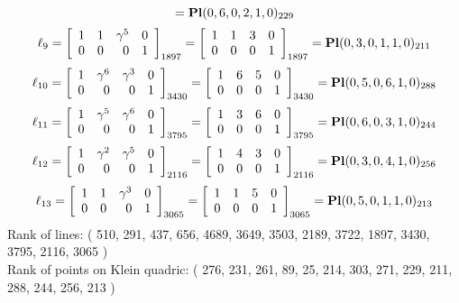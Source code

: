 \documentclass{article}
\begin{document}
{$$={\rm\bf Pl}(0,6,0,2,1,0 )_{229}$$
$$
\ell_{9} = 
\left[
\begin{array}{*{4}{r}}
1 & 1 & \gamma^{5} & 0\\
0 & 0 & 0 & 1\\
\end{array}
\right]
_{1897}
=
\left[
\begin{array}{*{4}c}
1  & 1  & 3  & 0\\
0  & 0  & 0  & 1\\
\end{array}
\right]_{1897}
={\rm\bf Pl}(0,3,0,1,1,0 )_{211}$$
$$
\ell_{10} = 
\left[
\begin{array}{*{4}{r}}
1 & \gamma^{6} & \gamma^{3} & 0\\
0 & 0 & 0 & 1\\
\end{array}
\right]
_{3430}
=
\left[
\begin{array}{*{4}c}
1  & 6  & 5  & 0\\
0  & 0  & 0  & 1\\
\end{array}
\right]_{3430}
={\rm\bf Pl}(0,5,0,6,1,0 )_{288}$$
$$
\ell_{11} = 
\left[
\begin{array}{*{4}{r}}
1 & \gamma^{5} & \gamma^{6} & 0\\
0 & 0 & 0 & 1\\
\end{array}
\right]
_{3795}
=
\left[
\begin{array}{*{4}c}
1  & 3  & 6  & 0\\
0  & 0  & 0  & 1\\
\end{array}
\right]_{3795}
={\rm\bf Pl}(0,6,0,3,1,0 )_{244}$$
$$
\ell_{12} = 
\left[
\begin{array}{*{4}{r}}
1 & \gamma^{2} & \gamma^{5} & 0\\
0 & 0 & 0 & 1\\
\end{array}
\right]
_{2116}
=
\left[
\begin{array}{*{4}c}
1  & 4  & 3  & 0\\
0  & 0  & 0  & 1\\
\end{array}
\right]_{2116}
={\rm\bf Pl}(0,3,0,4,1,0 )_{256}$$
$$
\ell_{13} = 
\left[
\begin{array}{*{4}{r}}
1 & 1 & \gamma^{3} & 0\\
0 & 0 & 0 & 1\\
\end{array}
\right]
_{3065}
=
\left[
\begin{array}{*{4}c}
1  & 1  & 5  & 0\\
0  & 0  & 0  & 1\\
\end{array}
\right]_{3065}
={\rm\bf Pl}(0,5,0,1,1,0 )_{213}$$
Rank of lines: ( 510, 291, 437, 656, 4689, 3649, 3503, 2189, 3722, 1897, 3430, 3795, 2116, 3065 )\\
Rank of points on Klein quadric: ( 276, 231, 261, 89, 25, 214, 303, 271, 229, 211, 288, 244, 256, 213 )\\
}
\end{document}
